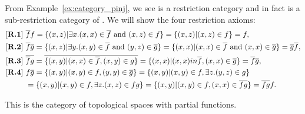 \begin{example}[\pinj]\label{ex:pinj_is_a_restriction_category}
From Example~\ref{ex:category_pinj}, we see \pinj is a restriction category and in fact is a
sub-restriction category of \Par. We will show the four restriction axioms:
\begin{align*}
  \rone\ & \rst{f}f = \{(x,z) | \exists x. (x,x) \in \rst{f} \text{ and } (x,z) \in f\} = \{(x,z) |
  (x,z) \in f\} = f,\\
  \rtwo\ & \rst{f}\rst{g} = \{(x,z) | \exists y. (x,y) \in \rst{f} \text{ and } (y,z) \in \rst{g}\} =
  \{(x,x) | (x,x) \in \rst{f} \text{ and } (x,x) \in \rst{g}\} = \rst{g}\rst{f},\\
  \rthree\ & \rst{\rst{f} g} = \rst{\{(x,y) | (x,x) \in \rst{f}, (x,y) \in g\}} = \{(x,x) | (x,x) in
  \rst{f}, (x,x) \in \rst{g} \} = \rst{f} \rst{g},\\
  \rfour\ & f \rst{g} = \{(x,y) | (x,y) \in f, (y,y) \in \rst{g}\} =  \{(x,y) | (x,y) \in f, \exists
  z. (y,z) \in g\} \\
  &=  \{(x,y) | (x,y) \in f, \exists z. (x,z) \in f g\} =  \{(x,y) | (x,y) \in f,
  (x,x) \in \rst{f g}\} = \rst{f g} f.
\end{align*}
\end{example}


\begin{example}[\topcatp]\label{ex:restriction_category_top}
  This is the category of topological spaces with partial functions.
\end{example}


